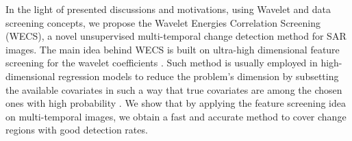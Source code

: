 \documentclass[journal]{IEEEtran}
\begin{document}



In the light of presented discussions and motivations, using Wavelet and data screening concepts, we propose the Wavelet Energies Correlation Screening (WECS), a novel unsupervised multi-temporal change detection method for SAR images.
%
The main idea behind WECS is built on ultra-high dimensional feature screening for the wavelet coefficients \cite{fan2020statistical}. Such method is usually employed in high-dimensional regression models to reduce the problem's dimension by subsetting the available covariates in such a way that true covariates are among the chosen ones with high probability \cite{fan2008sure}. We show that by applying the feature screening idea on multi-temporal images, we obtain a fast and accurate method to cover change regions with good detection rates.


\end{document}
